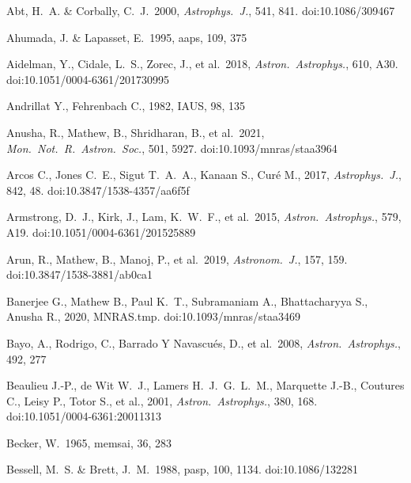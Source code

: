 \documentclass{jaa}
\def\apj{{\it Astrophys.~J.}}
\def\aj{{\it Astronom.~J.}}
\def\mnras{{\it Mon.~Not.~R.~Astron.~Soc.}}
\def\aap{{\it Astron.~Astrophys.}}
\def\apss{{\it Astrophys. Space Sci.}}
\begin{document}
\begin{thebibliography}{99}

 Abt, H.~A. \& Corbally, C.~J.\ 2000, \apj, 541, 841. doi:10.1086/309467

 Ahumada, J. \& Lapasset, E.\ 1995, aaps, 109, 375

 Aidelman, Y., Cidale, L.~S., Zorec, J., et al.\ 2018, \aap, 610, A30. doi:10.1051/0004-6361/201730995

 Andrillat Y., Fehrenbach C., 1982, IAUS, 98, 135

 Anusha, R., Mathew, B., Shridharan, B., et al.\ 2021, \mnras, 501, 5927. doi:10.1093/mnras/staa3964

 Arcos C., Jones C.~E., Sigut T.~A.~A., Kanaan S., Cur{\'e} M., 2017, \apj, 842, 48. doi:10.3847/1538-4357/aa6f5f

 Armstrong, D.~J., Kirk, J., Lam, K.~W.~F., et al.\ 2015, \aap, 579, A19. doi:10.1051/0004-6361/201525889

 Arun, R., Mathew, B., Manoj, P., et al.\ 2019, \aj, 157, 159. doi:10.3847/1538-3881/ab0ca1

 Banerjee G., Mathew B., Paul K.~T., Subramaniam A., Bhattacharyya S., Anusha R., 2020, MNRAS.tmp. doi:10.1093/mnras/staa3469

 Bayo, A., Rodrigo, C., Barrado Y Navascu{\'e}s, D., et al.\ 2008, \aap, 492, 277 %

 Beaulieu J.-P., de Wit W.~J., Lamers H.~J.~G.~L.~M., Marquette J.-B., Coutures C., Leisy P., Totor S., et al., 2001, \aap, 380, 168. doi:10.1051/0004-6361:20011313

 Becker, W.\ 1965, memsai, 36, 283

 Bessell, M.~S. \& Brett, J.~M.\ 1988, pasp, 100, 1134. doi:10.1086/132281


\end{thebibliography}
\end{document}
